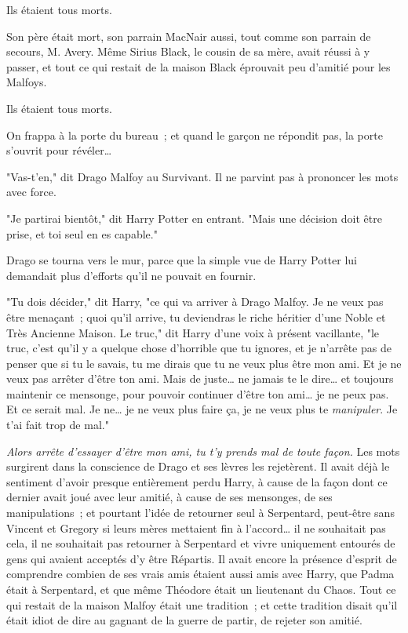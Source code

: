 Ils étaient tous morts.

Son père était mort, son parrain MacNair aussi, tout comme son parrain de secours, M. Avery. Même Sirius Black, le cousin de sa mère, avait réussi à y passer, et tout ce qui restait de la maison Black éprouvait peu d'amitié pour les Malfoys.

Ils étaient tous morts.

On frappa à la porte du bureau~; et quand le garçon ne répondit pas, la porte s'ouvrit pour révéler…

"Vas-t'en," dit Drago Malfoy au Survivant. Il ne parvint pas à prononcer les mots avec force.

"Je partirai bientôt," dit Harry Potter en entrant. "Mais une décision doit être prise, et toi seul en es capable."

Drago se tourna vers le mur, parce que la simple vue de Harry Potter lui demandait plus d'efforts qu'il ne pouvait en fournir.

"Tu dois décider," dit Harry, "ce qui va arriver à Drago Malfoy. Je ne veux pas être menaçant~; quoi qu'il arrive, tu deviendras le riche héritier d'une Noble et Très Ancienne Maison. Le truc," dit Harry d'une voix à présent vacillante, "le truc, c'est qu'il y a quelque chose d'horrible que tu ignores, et je n'arrête pas de penser que si tu le savais, tu me dirais que tu ne veux plus être mon ami. Et je ne veux pas arrêter d'être ton ami. Mais de juste… ne jamais te le dire… et toujours maintenir ce mensonge, pour pouvoir continuer d'être ton ami… je ne peux pas. Et ce serait mal. Je ne… je ne veux plus faire ça, je ne veux plus te \emph{manipuler}. Je t'ai fait trop de mal."

\emph{Alors arrête d'essayer d'être mon ami, tu t'y prends mal de toute façon.} Les mots surgirent dans la conscience de Drago et ses lèvres les rejetèrent. Il avait déjà le sentiment d'avoir presque entièrement perdu Harry, à cause de la façon dont ce dernier avait joué avec leur amitié, à cause de ses mensonges, de ses manipulations~; et pourtant l'idée de retourner seul à Serpentard, peut-être sans Vincent et Gregory si leurs mères mettaient fin à l'accord… il ne souhaitait pas cela, il ne souhaitait pas retourner à Serpentard et vivre uniquement entourés de gens qui avaient acceptés d'y être Répartis. Il avait encore la présence d'esprit de comprendre combien de ses vrais amis étaient aussi amis avec Harry, que Padma était à Serpentard, et que même Théodore était un lieutenant du Chaos. Tout ce qui restait de la maison Malfoy était une tradition~; et cette tradition disait qu'il était idiot de dire au gagnant de la guerre de partir, de rejeter son amitié.

